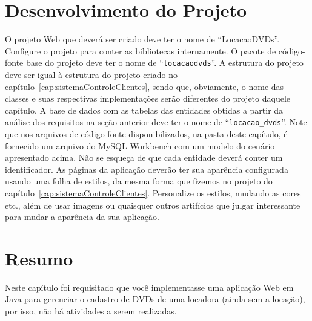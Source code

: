 \section{Desenvolvimento do Projeto}

O projeto Web que deverá ser criado deve ter o nome de ``LocacaoDVDs''. Configure o projeto para conter as bibliotecas internamente. O pacote de código-fonte base do projeto deve ter o nome de ``\texttt{locacaodvds}''. A estrutura do projeto deve ser igual à estrutura do projeto criado no capítulo~\ref{cap:sistemaControleClientes}, sendo que, obviamente, o nome das classes e suas respectivas implementações serão diferentes do projeto daquele capítulo. A base de dados com as tabelas das entidades obtidas a partir da análise dos requisitos na seção anterior deve ter o nome de ``\texttt{locacao\_dvds}''. Note que nos arquivos de código fonte disponibilizados, na pasta deste capítulo, é fornecido um arquivo do MySQL Workbench com um modelo do cenário apresentado acima. Não se esqueça de que cada entidade deverá conter um identificador. As páginas da aplicação deverão ter sua aparência configurada usando uma folha de estilos, da mesma forma que fizemos no projeto do capítulo~\ref{cap:sistemaControleClientes}. Personalize os estilos, mudando as cores etc., além de usar imagens ou quaisquer outros artifícios que julgar interessante para mudar a aparência da sua aplicação.


\section{Resumo}

Neste capítulo foi requisitado que você implementasse uma aplicação Web em Java para gerenciar o cadastro de DVDs de uma locadora (ainda sem a locação), por isso, não há atividades a serem realizadas.
